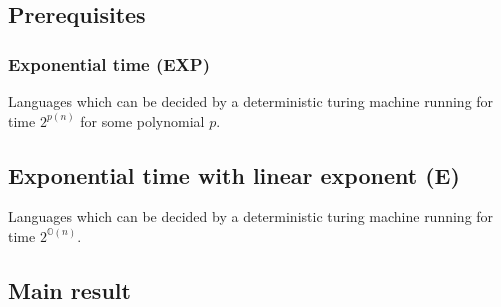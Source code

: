 \documentclass[../main.tex]{subfiles}
\begin{document}
\subsection{Prerequisites}

\subsubsection{Exponential time (EXP)}

Languages which can be decided by a deterministic turing machine running for time $2^{p(n)}$ for some polynomial $p$.

\subsection{Exponential time with linear exponent (E)}

Languages which can be decided by a deterministic turing machine running for time $2^{\mathbb{O}(n)}$.

\subsection{Main result}
\end{document}

